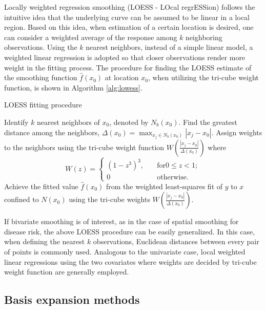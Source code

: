	Locally weighted regression smoothing (LOESS - LOcal regrESSion) follows the intuitive idea that the underlying curve can be assumed to be linear in a local region. Based on this idea, when estimation of a certain location is desired, one can consider a weighted average of the response among $k$ neighboring observations. Using the $k$ nearest neighbors, instead of a simple linear model, a weighted linear regression is adopted so that closer observations render more weight in the fitting process. The procedure for finding the LOESS estimate of the smoothing function $\hat{f}(x_0)$ at location $x_0$, when utilizing the tri-cube weight function, is shown in Algorithm \ref{alg:lowess}.  
	\begin{algorithm}[h]
		\caption{LOESS fitting procedure}
		\begin{algorithmic}[]
			\State Identify $k$ nearest neighbors of $x_0$, denoted by $N_{b}(x_0)$. 
			\State Find the greatest distance among the neighbors, $\Delta(x_0)=\max_{x_j\in N_b(x_0)}|x_j-x_0|$.
			\State Assign weights to the neighbors using the tri-cube weight function $W(\frac{|x_j-x_0|}{\Delta(x_0)})$ where
			\begin{equation} \label{func:triwt}
			W(z)=
			\begin{cases}
			(1-z^3)^3, &\quad \text{for} 0\leq z < 1;\\
			0 &\quad \text{otherwise}. 
			\end{cases}
			\end{equation} 
			\State Achieve the fitted value $\hat{f}(x_0)$ from the weighted least-squares fit of $y$ to $x$ confined to $N(x_0)$ using the tri-cube weights $W(\frac{|x_j-x_0|}{\Delta(x_0)})$.
		\end{algorithmic}
		\label{alg:lowess}
	\end{algorithm}

	If bivariate smoothing is of interest, as in the case of spatial smoothing for disease risk, the above LOESS procedure can be easily generalized. In this case, when defining the nearest $k$ observations, Euclidean distances between every pair of points is commonly used. Analogous to the univariate case, local weighted linear regressions using the two covariates where weights are decided by tri-cube weight function are generally employed. 

\subsection{Basis expansion methods}

